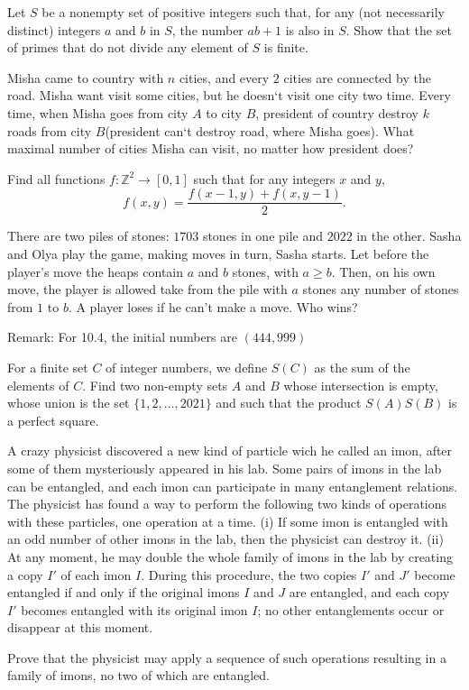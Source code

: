 \documentclass[11pt]{scrartcl}
\begin{document}
\begin{problem}[1690019174311406035]
Let $S$ be a nonempty set of positive integers such that, for any (not necessarily distinct) integers $a$ and $b$ in $S$, the number $ab+1$ is also in $S$. Show that the set of primes that do not divide any element of $S$ is finite.
\end{problem}
\begin{problem}[308215997593136]
Misha came to country with $n$ cities, and every $2$ cities are connected by the road. Misha want visit some cities, but he doesn`t visit one city two time. Every time, when Misha goes from city $A$ to city $B$, president of country destroy $k$ roads from city $B$(president can`t destroy road, where Misha goes). What maximal number of cities Misha can visit, no matter how president does?
\end{problem}
\begin{problem}[6360153743145135128]
Find all functions $f\colon \mathbb{Z}^2 \to [0, 1]$ such that for any integers $x$ and $y$,
\[f(x, y) = \frac{f(x - 1, y) + f(x, y - 1)}{2}.\]
\end{problem}
\begin{problem}[15195306726194]
There are two piles of stones: $1703$ stones in one pile and $2022$ in the other. Sasha and Olya
play the game, making moves in turn, Sasha starts. Let before the player's move the heaps contain $a$ and $b$ stones, with $a \geq b$. Then, on his own move, the player is allowed take from the pile with $a$ stones any number of stones from $1$ to $b$. A player loses if he can't make a move. Who wins?

Remark: For 10.4, the initial numbers are $(444,999)$
\end{problem}
\begin{problem}[576014113251153]
For a finite set $C$ of integer numbers, we define $S(C)$ as the sum of the elements of $C$. Find two non-empty sets $A$ and $B$ whose intersection is empty, whose union is the set $\{1,2,\ldots, 2021\}$ and such that the product $S(A)S(B)$ is a perfect square.
\end{problem}
\begin{problem}[685485832068823]
	A crazy physicist discovered a new kind of particle wich he called an imon, after some of them mysteriously appeared in his lab. Some pairs of imons in the lab can be entangled, and each imon can participate in many entanglement relations. The physicist has found a way to perform the following two kinds of operations with these particles, one operation at a time.
(i) If some imon is entangled with an odd number of other imons in the lab, then the physicist can destroy it.
(ii) At any moment, he may double the whole family of imons in the lab by creating a copy $I'$ of each imon $I$. During this procedure, the two copies $I'$ and $J'$ become entangled if and only if the original imons $I$ and $J$ are entangled, and each copy $I'$ becomes entangled with its original imon $I$; no other entanglements occur or disappear at this moment.

Prove that the physicist may apply a sequence of such operations resulting in a family of imons, no two of which are entangled.
\end{problem}
\end{document}
